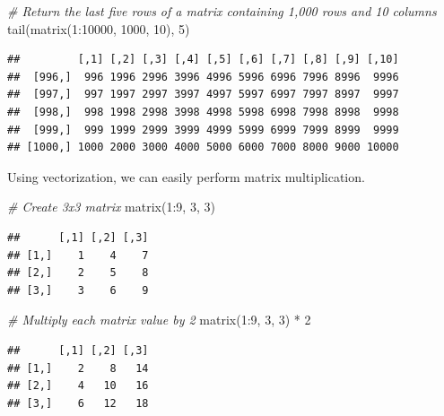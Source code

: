 \documentclass[
]{book}
\newenvironment{Shaded}{\begin{snugshade}}{\end{snugshade}}
\newcommand{\CommentTok}[1]{\textcolor[rgb]{0.56,0.35,0.01}{\textit{#1}}}
\newcommand{\DecValTok}[1]{\textcolor[rgb]{0.00,0.00,0.81}{#1}}
\newcommand{\FunctionTok}[1]{\textcolor[rgb]{0.00,0.00,0.00}{#1}}
\newcommand{\NormalTok}[1]{#1}
\newcommand{\SpecialCharTok}[1]{\textcolor[rgb]{0.00,0.00,0.00}{#1}}
\begin{document}
\begin{Shaded}
\begin{Highlighting}[]
\CommentTok{\# Return the last five rows of a matrix containing 1,000 rows and 10 columns}
\FunctionTok{tail}\NormalTok{(}\FunctionTok{matrix}\NormalTok{(}\DecValTok{1}\SpecialCharTok{:}\DecValTok{10000}\NormalTok{, }\DecValTok{1000}\NormalTok{, }\DecValTok{10}\NormalTok{), }\DecValTok{5}\NormalTok{)}
\end{Highlighting}
\end{Shaded}

\begin{verbatim}
##         [,1] [,2] [,3] [,4] [,5] [,6] [,7] [,8] [,9] [,10]
##  [996,]  996 1996 2996 3996 4996 5996 6996 7996 8996  9996
##  [997,]  997 1997 2997 3997 4997 5997 6997 7997 8997  9997
##  [998,]  998 1998 2998 3998 4998 5998 6998 7998 8998  9998
##  [999,]  999 1999 2999 3999 4999 5999 6999 7999 8999  9999
## [1000,] 1000 2000 3000 4000 5000 6000 7000 8000 9000 10000
\end{verbatim}

Using vectorization, we can easily perform matrix multiplication.

\begin{Shaded}
\begin{Highlighting}[]
\CommentTok{\# Create 3x3 matrix}
\FunctionTok{matrix}\NormalTok{(}\DecValTok{1}\SpecialCharTok{:}\DecValTok{9}\NormalTok{, }\DecValTok{3}\NormalTok{, }\DecValTok{3}\NormalTok{)}
\end{Highlighting}
\end{Shaded}

\begin{verbatim}
##      [,1] [,2] [,3]
## [1,]    1    4    7
## [2,]    2    5    8
## [3,]    3    6    9
\end{verbatim}

\begin{Shaded}
\begin{Highlighting}[]
\CommentTok{\# Multiply each matrix value by 2}
\FunctionTok{matrix}\NormalTok{(}\DecValTok{1}\SpecialCharTok{:}\DecValTok{9}\NormalTok{, }\DecValTok{3}\NormalTok{, }\DecValTok{3}\NormalTok{) }\SpecialCharTok{*} \DecValTok{2}
\end{Highlighting}
\end{Shaded}

\begin{verbatim}
##      [,1] [,2] [,3]
## [1,]    2    8   14
## [2,]    4   10   16
## [3,]    6   12   18
\end{verbatim}
\end{document}

